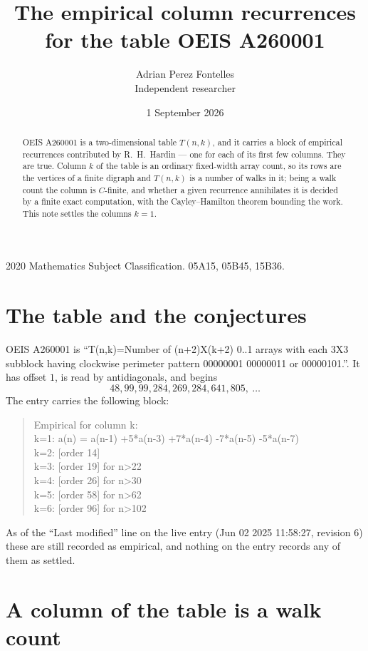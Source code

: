 \documentclass[11pt,a4paper]{article}
\title{The empirical column recurrences for the table OEIS A260001}
\author{Adrian Perez Fontelles\\ \small Independent researcher}
\date{1 September 2026}
\theoremstyle{plain}
\theoremstyle{definition}
\begin{document}
\maketitle

\begin{abstract}
OEIS A260001 is a two-dimensional table $T(n,k)$, and it carries a block of empirical
recurrences contributed by R.~H.~Hardin --- one for each of its first few columns. They are
true. Column $k$ of the table is an ordinary fixed-width array count, so its rows are the
vertices of a finite digraph and $T(n,k)$ is a number of walks in it; being a walk count the
column is $C$-finite, and whether a given recurrence annihilates it is decided by a finite
exact computation, with the Cayley--Hamilton theorem bounding the work. This note settles the columns $k=1$.
\end{abstract}

\noindent\small 2020 Mathematics Subject Classification. 05A15, 05B45, 15B36.\normalsize

\section{The table and the conjectures}

OEIS A260001 is ``T(n,k)=Number of (n+2)X(k+2) 0..1 arrays with each 3X3 subblock having clockwise perimeter pattern 00000001 00000011 or 00000101.''. It has offset $1$, is
read by antidiagonals, and begins
\[
48, 99, 99, 284, 269, 284, 641, 805,\ \dots
\]
The entry carries the following block:
\begin{quote}\small
Empirical for column k:\\
k=1: a(n) = a(n-1) +5*a(n-3) +7*a(n-4) -7*a(n-5) -5*a(n-7)\\
k=2: [order 14]\\
k=3: [order 19] for n>22\\
k=4: [order 26] for n>30\\
k=5: [order 58] for n>62\\
k=6: [order 96] for n>102\\
\end{quote}
As of the ``Last modified'' line on the live entry (Jun 02 2025 11:58:27, revision 6) these are still
recorded as empirical, and nothing on the entry records any of them as settled.

\section{A column of the table is a walk count}
\end{document}
